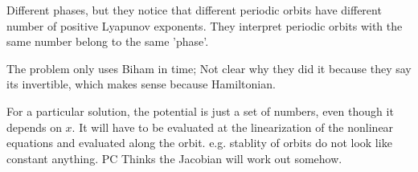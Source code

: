 Different phases, but they notice that different periodic orbits have different number
of positive Lyapunov exponents. They interpret periodic orbits with the same number belong
to the same 'phase'.

The problem only uses Biham in time; Not clear why they did it because they say its
invertible, which makes sense because Hamiltonian.



For a particular solution, the potential is just a set of numbers, even though it
depends on $x$. It will have to be evaluated at the linearization of the nonlinear
equations and evaluated along the orbit. e.g. stablity of orbits do not look like
constant anything. PC Thinks the Jacobian will work out somehow.

